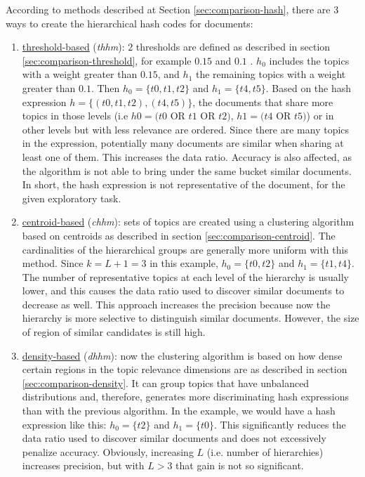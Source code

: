 According to methods described at Section \ref{sec:comparison-hash}, there are 3 ways to create the hierarchical hash codes for documents:
\begin{enumerate}
\item \underline{threshold-based} (\textit{thhm}): $2$ thresholds are defined as described in section \ref{sec:comparison-threshold}, for example $0.15$ and $0.1$ . $h_0$ includes the topics with a weight greater than $0.15$, and $h_1$ the remaining topics with a weight greater than $0.1$. Then $h_0=\{t0,t1,t2\}$ and $h_1=\{t4,t5\}$. Based on the hash expression $h=\{(t0,t1,t2),(t4,t5)\}$, the documents that share more topics in those levels (i.e $h0=(t0$ OR $t1$ OR $t2)$, $h1=(t4$ OR $t5)$) or in other levels but with less relevance are ordered. Since there are many topics in the expression, potentially many documents are similar when sharing at least one of them. This increases the data ratio. Accuracy is also affected, as the algorithm is not able to bring under the same bucket similar documents. In short, the hash expression is not representative of the document, for the given exploratory task.
\item \underline{centroid-based} (\textit{chhm}): sets of topics are created using a clustering algorithm based on centroids as described in section \ref{sec:comparison-centroid}. The cardinalities of the hierarchical groups are generally more uniform with this method. Since $k=L+1=3$ in this example, $h_0=\{t0,t2\}$ and $h_1=\{t1,t4\}$. The number of representative topics at each level of the hierarchy is usually lower, and this causes the data ratio used to discover similar documents to decrease as well. This approach increases the precision because now the hierarchy is more selective to distinguish similar documents. However, the size of region of similar candidates is still high.
\item \underline{density-based} (\textit{dhhm}): now the clustering algorithm is based on how dense certain regions in the topic relevance dimensions are as described in section \ref{sec:comparison-density}. It can group topics that have unbalanced distributions and, therefore, generates more discriminating hash expressions than with the previous algorithm. In the example, we would have a hash expression like this: $h_0=\{t2\}$ and $h_1=\{t0\}$. This significantly reduces the data ratio used to discover similar documents and does not excessively penalize accuracy. Obviously, increasing $L$ (i.e. number of hierarchies) increases precision, but with $L>3$ that gain is not so significant.
\end{enumerate}


